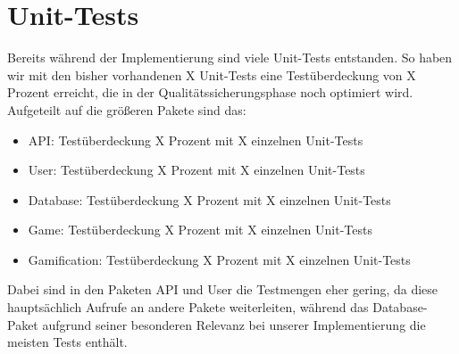 \documentclass[a4paper]{scrreprt}
\begin{document}
\chapter{Unit-Tests}
Bereits während der Implementierung sind viele Unit-Tests entstanden. So haben wir mit den bisher vorhandenen X Unit-Tests eine Testüberdeckung von X Prozent erreicht, die in der Qualitätssicherungsphase noch optimiert wird. Aufgeteilt auf die größeren Pakete sind das:
\begin{itemize}
	\item API: Testüberdeckung X Prozent mit X einzelnen Unit-Tests
	\item User: Testüberdeckung X Prozent mit X einzelnen Unit-Tests
	\item Database: Testüberdeckung X Prozent mit X einzelnen Unit-Tests
	\item Game: Testüberdeckung X Prozent mit X einzelnen Unit-Tests
	\item Gamification: Testüberdeckung X Prozent mit X einzelnen Unit-Tests
\end{itemize}
\hspace{1cm}

Dabei sind in den Paketen API und User die Testmengen eher gering, da diese hauptsächlich Aufrufe an andere Pakete weiterleiten, während das Database-Paket aufgrund seiner besonderen Relevanz bei unserer Implementierung die meisten Tests enthält.

\end{document}
